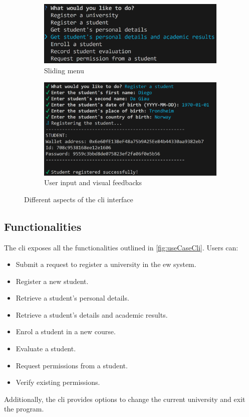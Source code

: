 \begin{figure}
    \centering
    \begin{subfigure}{.5\textwidth}
        \centering
        \includegraphics[width=\textwidth]{figures/CLI screen 1.png}
        \caption{Sliding menu}
        \label{sfig:cliDesign1}
    \end{subfigure}
    \hfill
    \begin{subfigure}{.60\textwidth}
        \centering
        \includegraphics[width=\textwidth]{figures/CLI screen 2.png}
        \caption{User input and visual feedbacks}
        \label{sfig:cliDesign2}
    \end{subfigure}
    \caption[Group of images showing different aspects of the \acrshort{cli} interface.]{Different aspects of the \acrshort{cli} interface}
    \label{fig:clifigs}
\end{figure}

\subsection{Functionalities}
The \acrshort{cli} exposes all the functionalities outlined in \cref{fig:useCaseCli}. Users can:
\begin{itemize}
    \item Submit a request to register a university in the \acrshort{ew} system.
    \item Register a new student.
    \item Retrieve a student’s personal details.
    \item Retrieve a student’s details and academic results.
    \item Enrol a student in a new course.
    \item Evaluate a student.
    \item Request permissions from a student.
    \item Verify existing permissions.
\end{itemize}
Additionally, the \acrshort{cli} provides options to change the current university and exit the program.

